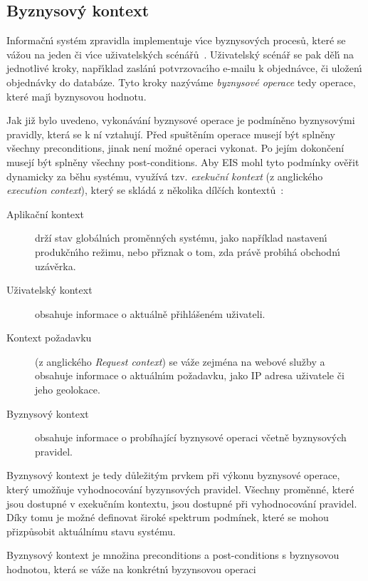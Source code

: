 \subsection{Byznysov\'y kontext}

Informačn\'{\i} systém zpravidla implementuje v\'{\i}ce byznysov\'ych procesů, které se vážou
na jeden či v\'{\i}ce uživatelsk\'ych scénářů~\cite{larman2001patterns}. Uživatelsk\'y scénář se
pak děl\'{\i} na jednotlivé kroky, např\'{\i}klad zaslán\'{\i} potvrzovac\'{\i}ho e-mailu k objednávce, či uložen\'{\i} objednávky
do databáze. Tyto kroky naz\'yváme \textit{byznysové operace} \textendash\xspace tedy operace, které maj\'{\i}
byznysovou hodnotu.

Jak již bylo uvedeno, vykonávání byznysové operace je podmíněno byznysovými pravidly, která se k ní vztahují. Před spuštěním operace musejí
být splněny všechny preconditions, jinak není možné operaci vykonat. Po jejím dokončení musejí být splněny všechny post-conditions.
Aby \gls{EIS} mohl tyto podmínky ověřit dynamicky za běhu systému, využívá tzv. \textit{exekuční kontext} (z anglického
\textit{execution context}), který se skládá z několika dílčích kontextů~\cite{cemus2017separation}:

\begin{description}
    \item[Aplikační kontext] drží stav globáln\'{\i}ch proměnn\'ych systému, jako například nastaven\'{\i}
    produkčn\'{\i}ho režimu, nebo př\'{\i}znak o tom, zda právě prob\'{\i}há obchodn\'{\i} uzávěrka.
    \item[Uživatelský kontext] obsahuje informace o aktuálně přihlášeném uživateli.
    \item[Kontext požadavku] (z anglického \textit{Request context}) se váže zejména na webové služby a obsahuje
    informace o aktuáln\'{\i}m požadavku, jako IP adresa uživatele či jeho geolokace.
    \item[Byznysov\'y kontext] obsahuje informace o probíhající byznysové operaci včetně byznysových pravidel.
\end{description}

Byznysový kontext je tedy důležitým prvkem při výkonu byznysové operace, který umožňuje vyhodnocování byzynsových pravidel.
Všechny proměnné, které jsou dostupné v exekučním kontextu, jsou dostupné při vyhodnocování pravidel. Díky tomu je možné
definovat široké spektrum podmínek, které se mohou přizpůsobit aktuálnímu stavu systému.

\begin{definition}
    Byznysový kontext je množina preconditions a post-conditions s byznysovou hodnotou, která se váže na
    konkrétn\'{\i} byzynsovou operaci~\cite{cemus2015automated}
\end{definition}


